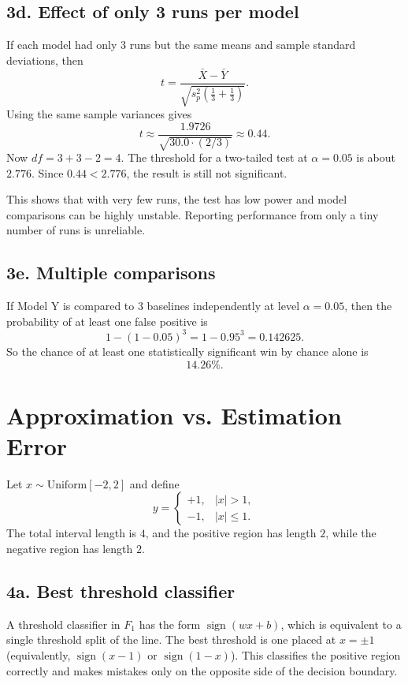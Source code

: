 \documentclass[11pt]{article}
\begin{document}
\subsection*{3d. Effect of only 3 runs per model}

If each model had only 3 runs but the same means and sample standard deviations, then
\[
 t = \frac{\bar X-\bar Y}{\sqrt{s_p^2\left(\frac13+\frac13\right)}}.
\]
Using the same sample variances gives
\[
 t \approx \frac{1.9726}{\sqrt{30.0\cdot(2/3)}}\approx 0.44.
\]
Now $df=3+3-2=4$. The threshold for a two-tailed test at $\alpha=0.05$ is about $2.776$.
Since $0.44<2.776$, the result is still not significant.

This shows that with very few runs, the test has low power and model comparisons can be highly unstable. Reporting performance from only a tiny number of runs is unreliable.

\subsection*{3e. Multiple comparisons}

If Model Y is compared to 3 baselines independently at level $\alpha=0.05$, then the probability of at least one false positive is
\[
1-(1-0.05)^3 = 1-0.95^3 = 0.142625.
\]
So the chance of at least one statistically significant win by chance alone is
\[
\boxed{14.26\%.}
\]

\section{Approximation vs. Estimation Error}

Let $x\sim \text{Uniform}[-2,2]$ and define
\[
 y = \begin{cases}
 +1, & |x|>1,\\
 -1, & |x|\le 1.
 \end{cases}
\]
The total interval length is $4$, and the positive region has length $2$, while the negative region has length $2$.

\subsection*{4a. Best threshold classifier}

A threshold classifier in $F_1$ has the form $\operatorname{sign}(wx+b)$, which is equivalent to a single threshold split of the line.
The best threshold is one placed at $x=\pm 1$ (equivalently, $\operatorname{sign}(x-1)$ or $\operatorname{sign}(1-x)$). This classifies the positive region correctly and makes mistakes only on the opposite side of the decision boundary.
\end{document}
